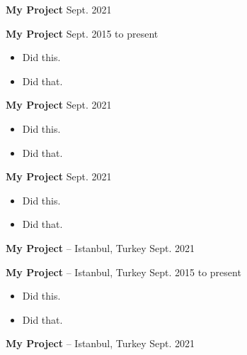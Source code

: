 \documentclass[10pt, letterpaper]{article}
\newenvironment{highlights}{
        \begin{itemize}[
                topsep=0pt,
                partopsep=0pt,
                itemsep=0pt,
                leftmargin=10pt
            ]
    }{
        \end{itemize}
    } %
\begin{document}
        \vspace{8pt}

        \textbf{My Project} \hfill Sept. 2021



        \vspace{8pt}

        \textbf{My Project} \hfill Sept. 2015 to present

        \begin{highlights}
        \item Did this.
        \item Did that.
        \end{highlights}


        \vspace{8pt}

        \textbf{My Project} \hfill Sept. 2021

        \begin{highlights}
        \item Did this.
        \item Did that.
        \end{highlights}


        \vspace{8pt}

        \textbf{My Project} \hfill Sept. 2021

        \begin{highlights}
        \item Did this.
        \item Did that.
        \end{highlights}


        \vspace{8pt}

        \textbf{My Project} -- Istanbul, Turkey \hfill Sept. 2021



        \vspace{8pt}

        \textbf{My Project} -- Istanbul, Turkey \hfill Sept. 2015 to present

        \begin{highlights}
        \item Did this.
        \item Did that.
        \end{highlights}


        \vspace{8pt}

        \textbf{My Project} -- Istanbul, Turkey \hfill Sept. 2021
\end{document}
